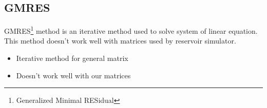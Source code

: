 \subsection{GMRES}
GMRES\footnote{Generalized Minimal RESidual} method is an iterative method used to solve system of linear equation.
%
This method doesn't work well with matrices used by reservoir simulator.


  \begin{itemize}
    \item Iterative method for general matrix
    \item Doesn't work well with our matrices
  \end{itemize}
